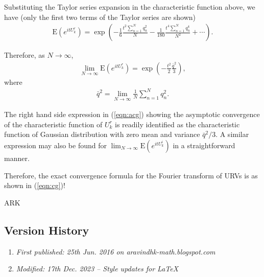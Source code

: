 Substituting the Taylor series expansion in the characteristic function above, we have (only the first two terms of the Taylor series are shown)
\begin{align}\text{E}(e^{itU_k^r}) = \exp\left(-\frac{1}{6} \frac{t^2 \sum_{n = 1}^{N} q^2_n}{N} - \frac{1}{180}\frac{t^4 \sum_{n = 1}^{N} q^4_n}{N^2} + \cdots\right). \label{eqn:cg}\end{align}

Therefore, as $N\to \infty$, 
\begin{align}\lim_{N\to \infty} \text{E}(e^{itU_k^r}) = \exp\left(-\frac{t^2}{2} \frac{\bar{q}^2}{3}\right), \label{eqn:acg} \end{align}
where
\begin{align}\bar{q}^2 = \lim_{N\to \infty} \frac{1}{N}\sum_{n = 1}^{N} q_n^2.\end{align}

The right hand side expression in (\ref{eqn:acg}) showing the asymptotic convergence of the characteristic function of $U^r_k$ is readily identified as the characteristic function of Gaussian distribution with zero mean and variance $\bar{q}^2/3$. A similar expression may also be found for $\lim_{N\to \infty} \text{E}(e^{itU_k^i})$ in a straightforward manner.

Therefore, the exact convergence formula for the Fourier transform of URVs is as shown in (\ref{eqn:cg})!

ARK

\subsection{Version History}
\begin{enumerate}
	\item \emph{First published: 25th Jun. 2016 on aravindhk-math.blogspot.com}
	\item \emph{Modified: 17th Dec. 2023 -- Style updates for \LaTeX}
\end{enumerate}



